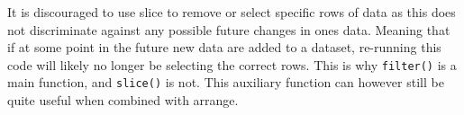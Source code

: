 \documentclass[]{book}
\newenvironment{Shaded}{\begin{snugshade}}{\end{snugshade}}
\newcommand{\KeywordTok}[1]{\textcolor[rgb]{0.13,0.29,0.53}{\textbf{#1}}}
\newcommand{\DataTypeTok}[1]{\textcolor[rgb]{0.13,0.29,0.53}{#1}}
\newcommand{\DecValTok}[1]{\textcolor[rgb]{0.00,0.00,0.81}{#1}}
\newcommand{\StringTok}[1]{\textcolor[rgb]{0.31,0.60,0.02}{#1}}
\newcommand{\CommentTok}[1]{\textcolor[rgb]{0.56,0.35,0.01}{\textit{#1}}}
\newcommand{\OperatorTok}[1]{\textcolor[rgb]{0.81,0.36,0.00}{\textbf{#1}}}
\newcommand{\NormalTok}[1]{#1}
\theoremstyle{definition}
\theoremstyle{definition}
\theoremstyle{definition}
\theoremstyle{remark}
\begin{document}
\begin{Shaded}
\end{Shaded}

It is discouraged to use slice to remove or select specific rows of data
as this does not discriminate against any possible future changes in
ones data. Meaning that if at some point in the future new data are
added to a dataset, re-running this code will likely no longer be
selecting the correct rows. This is why \texttt{filter()} is a main
function, and \texttt{slice()} is not. This auxiliary function can
however still be quite useful when combined with arrange.

\begin{Shaded}
\end{Shaded}
\end{document}
